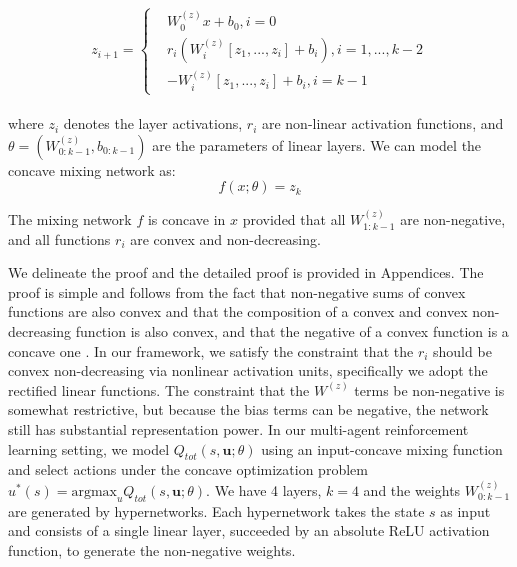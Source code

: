 {\begin{equation}
\begin{array}{l}
\begin{aligned}
z_{i+1} = \left\{
\begin{aligned}
&W^{(z)}_0x + b_0, i = 0 \\
&r_i(W^{(z)}_i[z_1, ..., z_i]  + b_i), i = 1, ..., k - 2\\%
&-W^{(z)}_i[z_1, ..., z_i]  + b_i, i = k - 1
\end{aligned}
\right.  
\end{aligned}
\end{array}
\end{equation}

where $z_i$ denotes the layer activations, $r_i$ are non-linear activation functions, and $\theta = (W^{(z)}_{0:k-1}, b_{0:k-1})$ are the parameters of linear layers. We can model the concave mixing network as:
\begin{equation}
    f(x;\theta) = z_k
\end{equation}


{
\begin{theorem}
The mixing network $f$ is concave in $x$ provided that all $W^{(z)}_{1:k-1}$ are non-negative, and all functions $r_i$ are convex and non-decreasing.
\end{theorem}
}
 We delineate the proof and the detailed proof is provided in Appendices. The proof is simple and follows from the fact that non-negative sums of convex functions are also convex and that the composition of a convex and convex non-decreasing function is also convex, and that the negative of a convex function is a concave one \cite{convex_optimization}. In our framework, we satisfy the constraint that the $r_i$ should be convex non-decreasing via nonlinear activation units, specifically we adopt the rectified linear functions. The constraint that the $W^{(z)}$ terms be non-negative is somewhat restrictive, but because the bias terms can be negative, the network still has substantial representation power. In our multi-agent reinforcement learning setting, we model $Q_{tot}(s, \textbf{u}; \theta)$ using an input-concave mixing function and select actions under the concave optimization problem $u^*(s) = \text{argmax}_u{Q_{tot}(s, \textbf{u}; \theta)}$.  We have 4 layers, $k = 4$ and the weights  $W_{0:k-1}^{(z)}$ are generated by hypernetworks. Each hypernetwork takes the state
$s$ as input and consists of a single linear layer, succeeded by an absolute ReLU activation function, to generate the non-negative weights. 


}
